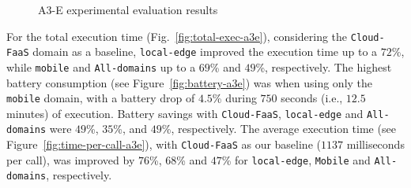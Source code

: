 \begin{figure}[htb]
	\raggedright
	\captionsetup[subfigure]{width=0.33\textwidth}	
	\captionsetup[subfigure]{width=0.33\textwidth}
	\captionsetup[subfigure]{width=0.33\textwidth}
	
	\caption{A3-E experimental evaluation results} \label{fig:exp-a3e}
\end{figure}


For the total execution time (Fig.~\ref{fig:total-exec-a3e}), considering the \texttt{Cloud-FaaS} domain as a baseline, \texttt{local-edge} improved the execution time up to a $72$\%, while \texttt{mobile} and \texttt{All-domains} up to a $69$\% and $49$\%, respectively. The highest battery consumption (see Figure~\ref{fig:battery-a3e}) was when using only the \texttt{mobile} domain, with a battery drop of $4.5$\% during $750$ seconds (i.e., $12.5$ minutes) of execution. Battery savings with \texttt{Cloud-FaaS}, \texttt{local-edge} and \texttt{All-domains} were $49$\%, $35$\%, and $49$\%, respectively. The average execution time (see Figure~\ref{fig:time-per-call-a3e}), with \texttt{Cloud-FaaS} as our baseline ($1137$ milliseconds per call), was improved by $76$\%, $68$\% and $47$\% for \texttt{local-edge}, \texttt{Mobile} and \texttt{All-domains}, respectively. 

